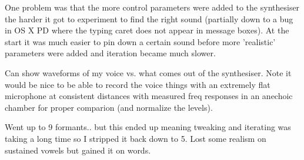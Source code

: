One problem was that the more control parameters were added to the synthesiser the harder it got to experiment to find the right sound (partially down to a bug in OS X PD where the typing caret does not appear in message boxes). At the start it was much easier to pin down a certain sound before more 'realistic' parameters were added and iteration became much slower.

Can show waveforms of my voice vs. what comes out of the synthesiser. Note it would be nice to be able to record the voice things with an extremely flat microphone at consistent distances with measured freq responses in an anechoic chamber for proper comparion (and normalize the levels).

Went up to 9 formants.. but this ended up meaning tweaking and iterating was taking a long time so I stripped it back down to 5. Lost some realism on sustained vowels but gained it on words.